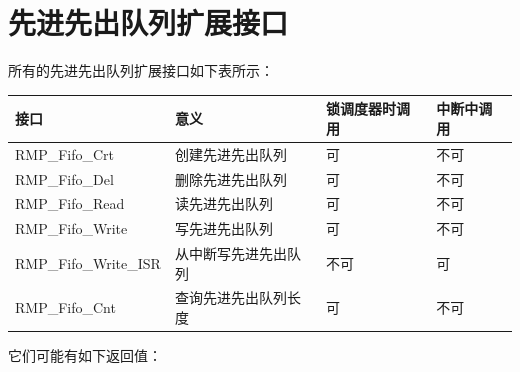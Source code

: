\section{先进先出队列扩展接口}\label{sec:first-in-first-out-queue-extension-interface}

所有的先进先出队列扩展接口如下表所示：

\label{tab:fifo-extension-interface-summary}

{\def\LTcaptype{none} %
\begin{longtable}[]{@{}
  >{\raggedright\arraybackslash}p{}
  >{\raggedright\arraybackslash}p{}
  >{\raggedright\arraybackslash}p{}
  >{\raggedright\arraybackslash}p{}@{}}
\toprule\noalign{}
\begin{minipage}[b]{\linewidth}\raggedright
接口
\end{minipage} & \begin{minipage}[b]{\linewidth}\raggedright
意义
\end{minipage} & \begin{minipage}[b]{\linewidth}\raggedright
锁调度器时调用
\end{minipage} & \begin{minipage}[b]{\linewidth}\raggedright
中断中调用
\end{minipage} \\
\midrule\noalign{}
\endhead
\bottomrule\noalign{}
\endlastfoot
RMP\_Fifo\_Crt & 创建先进先出队列 & 可 & 不可 \\
RMP\_Fifo\_Del & 删除先进先出队列 & 可 & 不可 \\
RMP\_Fifo\_Read & 读先进先出队列 & 可 & 不可 \\
RMP\_Fifo\_Write & 写先进先出队列 & 可 & 不可 \\
RMP\_Fifo\_Write\_ISR & 从中断写先进先出队列 & 不可 & 可 \\
RMP\_Fifo\_Cnt & 查询先进先出队列长度 & 可 & 不可 \\
\end{longtable}
}

它们可能有如下返回值：

\label{tab:possible-return-values-of-the-fifo-extension-interface}

